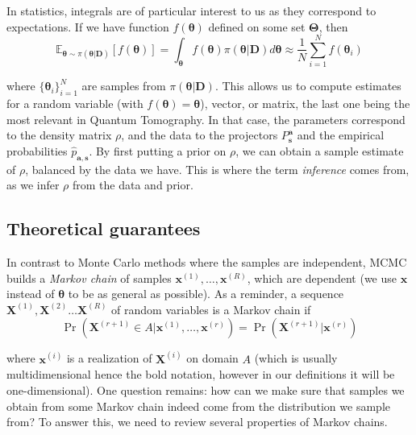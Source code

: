 \documentclass[12pt]{memoir}
\newcommand{\mb}{\mathbf}
\newcommand{\ti}{\textit}
\newcommand{\btheta}{\boldsymbol{\theta}}
\begin{document}
In statistics, integrals are of particular interest to us as they correspond to expectations. If we have function $f(\boldsymbol{\theta})$ defined on some set $\boldsymbol{\Theta}$, then
\begin{equation}
    \mathbb E_{\boldsymbol \theta \sim \pi(\btheta|\mb{D})}\left[f(\boldsymbol{\theta})\right] = \int_{\boldsymbol{\theta}} f(\boldsymbol{\theta})\pi(\btheta|\mb{D}) d\boldsymbol{\btheta} \approx \frac{1}{N} \sum_{i=1}^{N} f(\boldsymbol{\theta}_i)
\end{equation}

where $\{\boldsymbol{\theta}_i\}^N_{i=1}$ are samples from $\pi(\btheta|\mb{D})$. This allows us to compute estimates for a random variable (with $f(\btheta) = \btheta$), vector, or matrix, the last one being the most relevant in Quantum Tomography. In that case, the parameters correspond to the density matrix $\rho$, and the data to the projectors $P^{\mb a}_{\mb s}$ and the empirical probabilities $\hat p_{\mb a,\mb s}$. By first putting a prior on $\rho$, we can obtain a sample estimate of $\rho$, balanced by the data we have. This is where the term \ti{inference} comes from, as we infer $\rho$ from the data and prior.


\subsection{Theoretical guarantees}\label{section:background:mcmc:theory}

In contrast to Monte Carlo methods where the samples are independent, MCMC builds a \ti{Markov chain} of samples $\mb x^{(1)}, \dots, \mb x^{(R)}$, which are dependent (we use $\mb x$ instead of $\btheta$ to be as general as possible). As a reminder, a sequence $\mb X^{(1)}, \mb X^{(2)} \dots \mb X^{(R)}$ of random variables is a Markov chain if
\begin{equation}
    \Pr(\mb X^{(r+1)} \in A|\mb x^{(1)}, \dots, \mb x^{(r)}) = \Pr(\mb X^{(r+1)}|\mb x^{(r)})
\end{equation}

where $\mb x^{(i)}$ is a realization of $\mb X^{(i)}$ on domain $A$ (which is usually multidimensional hence the bold notation, however in our definitions it will be one-dimensional). One question remains: how can we make sure that samples we obtain from some Markov chain indeed come from the distribution we sample from? To answer this, we need to review several properties of Markov chains.\medbreak
\end{document}
